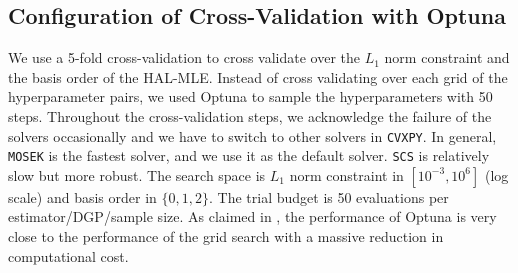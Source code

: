 \subsection{Configuration of Cross-Validation with Optuna}
We use a 5-fold cross-validation to cross validate over the $L_1$ norm constraint and the basis order of the HAL-MLE. Instead of cross validating over each grid of the hyperparameter pairs, we used Optuna \citep{akiba2019optuna} to sample the hyperparameters with 50 steps. Throughout the cross-validation steps, we acknowledge the failure of the solvers occasionally and we have to switch to other solvers in \texttt{CVXPY}. In general, \texttt{MOSEK} is the fastest solver, and we use it as the default solver. \texttt{SCS} is relatively slow but more robust. The search space is $L_1$ norm constraint in $[10^{-3},10^{6}]$ (log scale) and basis order in $\{0,1,2\}$. The trial budget is 50 evaluations per estimator/DGP/sample size. As claimed in \citep{akiba2019optuna}, the performance of Optuna is very close to the performance of the grid search with a massive reduction in computational cost.